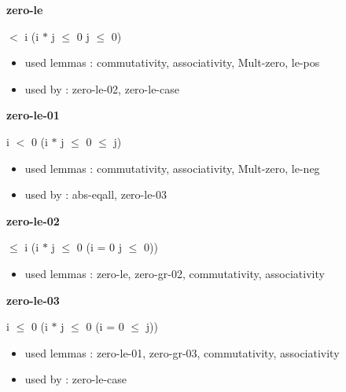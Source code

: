 \documentclass[a4paper]{article}
\begin{document}
\medskip

\bigskip

{\large\bf zero-le}

\medskip

  $<$ i \Imp (i $*$ j $\le$ 0 \Equiv j $\le$ 0)

\begin{itemize}


\item       used lemmas  : commutativity, associativity, Mult-zero, le-pos
\item       used by      : zero-le-02, zero-le-case

\end{itemize}

\medskip

\bigskip

{\large\bf zero-le-01}

\medskip

 \Fol i $<$ 0 \Imp (i $*$ j $\le$ 0  $\le$ j)

\begin{itemize}


\item       used lemmas  : commutativity, associativity, Mult-zero, le-neg
\item       used by      : abs-eqall, zero-le-03

\end{itemize}

\medskip

\bigskip

{\large\bf zero-le-02}

\medskip

  $\le$ i \Imp (i $*$ j $\le$ 0 \Equiv \Not \Not (i = 0 \Or j $\le$ 0))

\begin{itemize}


\item       used lemmas  : zero-le, zero-gr-02, commutativity, associativity

\end{itemize}

\medskip

\bigskip

{\large\bf zero-le-03}

\medskip

 \Fol i $\le$ 0 \Imp (i $*$ j $\le$ 0 \Equiv \Not \Not (i = 0  $\le$ j))

\begin{itemize}


\item       used lemmas  : zero-le-01, zero-gr-03, commutativity, associativity
\item       used by      : zero-le-case

\end{itemize}
\end{document}

